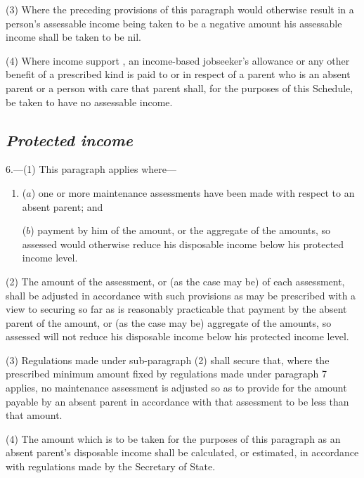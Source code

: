 \documentclass[12pt,a4paper]{article}
\begin{document}
(3) Where the preceding provisions of this paragraph would otherwise result in a person’s assessable income being taken to be a negative amount his assessable income shall be taken to be nil.

(4) Where income support%
, an income-based jobseeker’s allowance  %
 or any other benefit of a prescribed kind is paid to or in respect of a parent who is an absent parent or a person with care that parent shall, for the purposes of this Schedule, be taken to have no assessable income.


\subsection*{\itshape Protected income}

6.---(1) This paragraph applies where—
\begin{enumerate}\item[]
($a$) one or more maintenance assessments have been made with respect to an absent parent; and

($b$) payment by him of the amount, or the aggregate of the amounts, so assessed would otherwise reduce his disposable income below his protected income level.
\end{enumerate}

(2) The amount of the assessment, or (as the case may be) of each assessment, shall be adjusted in accordance with such provisions as may be prescribed with a view to securing so far as is reasonably practicable that payment by the absent parent of the amount, or (as the case may be) aggregate of the amounts, so assessed will not reduce his disposable income below his protected income level.

(3) Regulations made under sub-paragraph (2)  shall secure that, where the prescribed minimum amount fixed by regulations made under paragraph 7 applies, no maintenance assessment is adjusted so as to provide for the amount payable by an absent parent in accordance with that assessment to be less than that amount.

(4) The amount which is to be taken for the purposes of this paragraph as an absent parent’s disposable income shall be calculated, or estimated, in accordance with regulations made by the Secretary of State.
\end{document}
